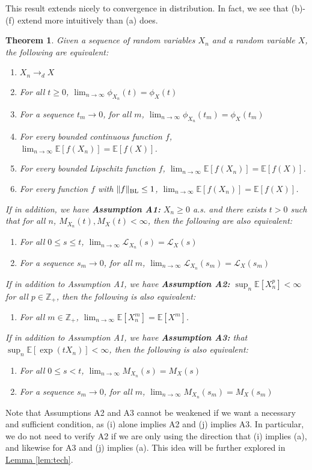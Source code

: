 \documentclass{article}
\newtheorem{theorem}{Theorem}
\theoremstyle{definition}
\newcommand{\E}{\mathbb E}
\newcommand{\1}{\mathbb I}
\newcommand{\Z}{\mathbb Z}
\newcommand{\BL}{\mathop{\text{\rm BL}}}
\newcommand{\lemhref}[1]{\hyperref[#1]{Lemma \ref{#1}}}
\begin{document}
This result extends nicely to convergence in distribution.  In fact,
we see that (b)-(f) extend more intuitively than (a) does.
\begin{theorem}
  \label{thm:convergence}
 Given a sequence of random variables $X_n$ and a random variable $X$, the following are equivalent:
  \begin{enumerate}
  \item [a.] $X_n \to_d X$
  \item [b.] For all $t \geq 0$, $\lim_{n \to \infty} \phi_{X_n}(t) = \phi_X(t)$
  \item [c.] For a sequence $t_m \to 0$, for all $m$, $\lim_{n \to \infty} \phi_{X_n}(t_m) = \phi_X(t_m)$
  \item [d.] For every bounded continuous function $f$, $\lim_{n \to \infty}\E[f(X_n)] = \E[f(X)]$.
  \item [e.] For every bounded Lipschitz function $f$, $\lim_{n \to \infty}\E[f(X_n)] = \E[f(X)]$.
  \item [f.] For every function $f$ with $\|f\|_{\BL} \leq 1$, $\lim_{n \to \infty}\E[f(X_n)] = \E[f(X)]$.
  \end{enumerate}
  If in addition, we have {\bf Assumption A1:} $X_n \geq 0$ a.s. and there exists $t > 0$ such that for all $n$, $M_{X_n}(t), M_X(t) < \infty$, then the following
  are also equivalent:
  \begin{enumerate}
    \item [g.] For all $0 \leq s \leq t$, $\lim_{n \to \infty} \mathcal L_{X_n}(s) = \mathcal L_{X}(s)$
  \item [h.] For a sequence $s_m \to 0$, for all $m$, $\lim_{n \to \infty} \mathcal L_{X_n}(s_m) = \mathcal L_X(s_m)$
  \end{enumerate}
  If in addition to Assumption A1, we have {\bf Assumption A2:} $\sup_n \E[X_n^p] < \infty$ for all $p \in \Z_+$, then the following is also equivalent:
  \begin{enumerate}
  \item [i.] For all $m \in \Z_+$, $\lim_{n \to \infty} \E[X_n^m] =
    \E[X^m]$.  
  \end{enumerate}
  If in addition to Assumption A1, we have {\bf Assumption A3:} that $\sup_n \E[\exp(tX_n)] < \infty$, then the following is also equivalent:
  \begin{enumerate}
\item [j.] For all $0 \leq s < t$, $\lim_{n \to \infty} M_{X_n}(s) = M_{X}(s)$
  \item [k.] For a sequence $s_m \to 0$, for all $m$, $\lim_{n \to \infty} M_{X_n}(s_m) = M_X(s_m)$
  \end{enumerate}
\end{theorem}
Note that Assumptions A2 and A3 cannot be weakened if we want a
necessary and sufficient condition, as (i) alone implies A2 and (j)
implies A3.  In particular, we do not need to verify A2 if we are only
using the direction that (i) implies (a), and likewise for A3 and (j)
implies (a).  This idea will be further explored in
\lemhref{lem:tech}.
\end{document}
